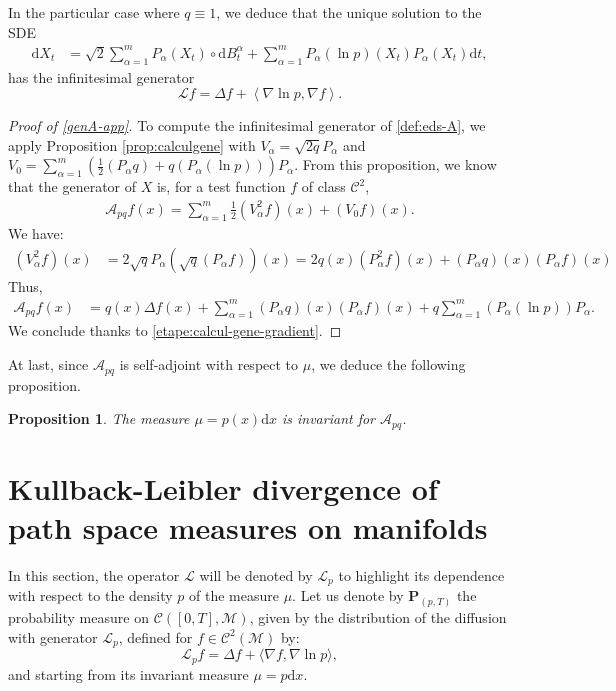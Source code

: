 \documentclass[10pt,a4paper]{article}
\renewcommand{\P}{{\mathbf P}}
\newcommand{\cL}{\mathcal{L}}
\newcommand\cA{\mathcal{A}}
\newcommand\cC{\mathcal{C}}
\newcommand\cM{\mathcal{M}}
\newcommand\dd{\mathrm{d}}
\newcommand{\SCA}[1]{{{\left\langle #1\right\rangle}}} %
\newcommand{\PAR}[1]{{{\left(#1\right)}}} %
\let \ssection=\section
\renewcommand{\section}{\setcounter{equation}{0}\ssection}
\newtheorem{proposition}[theorem]{Proposition}
\begin{document}
In the particular case where $q\equiv 1$, we deduce
that the unique solution to the SDE
\begin{align}\label{eq:EDS-L}
\dd X_t 
&=\sqrt{2}\sum_{\alpha=1}^mP_\alpha(X_t)\circ \dd B^\alpha_t+ \sum_{\alpha=1}^mP_\alpha \PAR{\ln p}(X_t)P_\alpha (X_t)\dd t,
\end{align}
has the infinitesimal generator
\[
\cL f=\Delta f +\SCA{\nabla \ln p, \nabla f}.
\]






\begin{proof}[Proof of \eqref{genA-app}] To compute the infinitesimal generator of \eqref{def:eds-A}, we apply Proposition \ref{prop:calculgene} with 
$V_\alpha=\sqrt{2q}P_\alpha$ and $V_0=\sum_{\alpha=1}^m\PAR{\frac{1}{2}\PAR{P_\alpha q}+q\PAR{P_\alpha (\ln p)}}P_\alpha $.
From this proposition, we know that the generator of $X$ is, for a test function $f$ of class $\cC^2$,
\begin{align*}
   \cA_{pq} f(x)=\sum_{\alpha=1}^m\frac{1}{2}(V^2_\alpha f)(x)+(V_0 f)(x).
\end{align*}
We have:
\begin{align*}
    \PAR{V_\alpha^2 f}(x)
    &=2\sqrt{q}P_\alpha(\sqrt{q}\PAR{P_\alpha f})(x)
    =2q(x)\PAR{P_\alpha^2 f}(x)+\PAR{P_\alpha q}(x)\PAR{P_\alpha f}(x)
\end{align*}
Thus,
\begin{align*}
\cA_{pq} f(x)
&=q(x)\Delta f(x)+\sum_{\alpha=1}^m\PAR{P_\alpha q}(x)\PAR{P_\alpha f}(x)+q\sum_{\alpha=1}^m\PAR{P_\alpha (\ln p)}P_\alpha.
\end{align*}
We conclude thanks to \eqref{etape:calcul-gene-gradient}.
\end{proof}


At last, since $\cA_{pq}$ is self-adjoint  with respect to $\mu$, we deduce the following proposition.

\begin{proposition}
The measure $\mu=p(x) \dd x$ is invariant for $\cA_{pq}$.	
\end{proposition}




\section{Kullback-Leibler divergence of path space measures on manifolds}\label{A:Kullback-Liebler}

In this section, the operator $\cL$ will be denoted by $\cL_p$ to highlight its dependence with respect to the density  $p$ of the measure $\mu$.
	Let us denote by \(\P_{(p,T)}\) the probability measure on $\cC([0,T],\mathcal{M})$, given by the distribution of the diffusion 
with generator $\mathcal{L}_p$, defined for $f\in \cC^2(\cM)$ by: 
\[\mathcal{L}_pf = \Delta f + \langle \nabla f, \nabla \ln p \rangle,\]
and starting from its invariant measure $\mu=p\dd x$.
\end{document}
